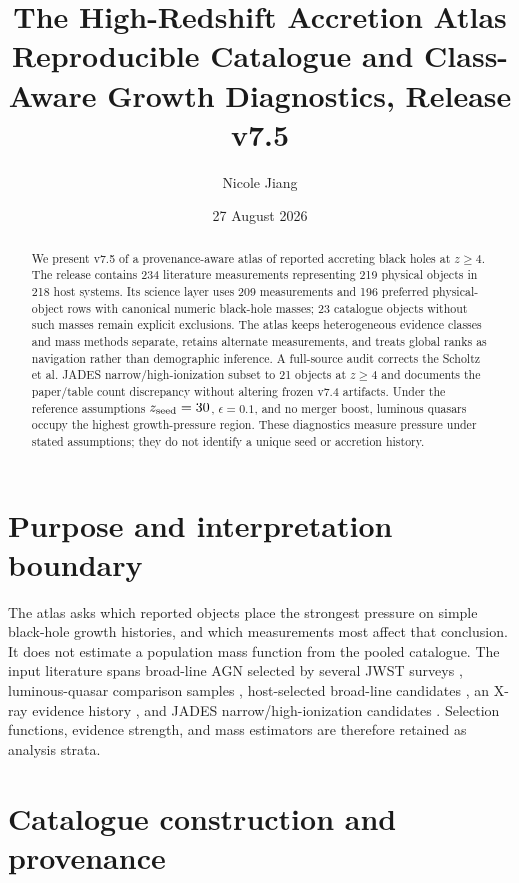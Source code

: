 \documentclass[11pt]{article}
\title{\textbf{The High-Redshift Accretion Atlas}\\
\large Reproducible Catalogue and Class-Aware Growth Diagnostics, Release v7.5}
\author{Nicole Jiang}
\date{27 August 2026}
\begin{document}
\maketitle

\begin{abstract}
We present v7.5 of a provenance-aware atlas of reported accreting black holes at
$z\geq4$. The release contains 234 literature measurements representing 219
physical objects in 218 host systems. Its science layer uses 209 measurements
and 196 preferred physical-object rows with canonical numeric black-hole masses;
23 catalogue objects without such masses remain explicit exclusions. The atlas
keeps heterogeneous evidence classes and mass methods separate, retains
alternate measurements, and treats global ranks as navigation rather than
demographic inference. A full-source audit corrects the Scholtz et al. JADES
narrow/high-ionization subset to 21 objects at $z\geq4$ and documents the
paper/table count discrepancy without altering frozen v7.4 artifacts. Under the
reference assumptions $z_{\rm seed}=30$, $\epsilon=0.1$, and no merger boost,
luminous quasars occupy the highest growth-pressure region. These diagnostics
measure pressure under stated assumptions; they do not identify a unique seed or
accretion history.
\end{abstract}

\section{Purpose and interpretation boundary}

The atlas asks which reported objects place the strongest pressure on simple
black-hole growth histories, and which measurements most affect that conclusion.
It does not estimate a population mass function from the pooled catalogue. The
input literature spans broad-line AGN selected by several JWST surveys
\cite{juodzbalis2026,taylor2025,matthee2024,lin2024,harikane2023,davis2026},
luminous-quasar comparison samples \cite{mazzucchelli2023,shen2019}, host-selected
broad-line candidates \cite{ren2025}, an X-ray evidence history
\cite{bogdan2024,zou2026}, and JADES narrow/high-ionization candidates
\cite{scholtz2025}. Selection functions, evidence strength, and mass estimators
are therefore retained as analysis strata.

\section{Catalogue construction and provenance}
\end{document}

